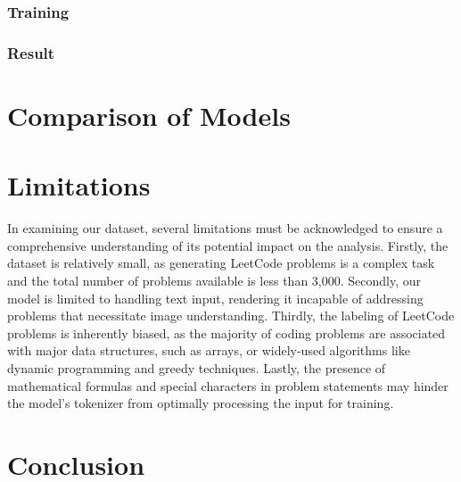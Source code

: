 \documentclass{article}
\begin{document}
\subsubsection{Training}
\subsubsection{Result}

\section{Comparison of Models}

\section{Limitations}
In examining our dataset, several limitations must be acknowledged to ensure a comprehensive understanding of its potential impact on the analysis. Firstly, the dataset is relatively small, as generating LeetCode problems is a complex task and the total number of problems available is less than 3,000. Secondly, our model is limited to handling text input, rendering it incapable of addressing problems that necessitate image understanding. Thirdly, the labeling of LeetCode problems is inherently biased, as the majority of coding problems are associated with major data structures, such as arrays, or widely-used algorithms like dynamic programming and greedy techniques. Lastly, the presence of mathematical formulas and special characters in problem statements may hinder the model’s tokenizer from optimally processing the input for training.


\section{Conclusion}
\end{document}
